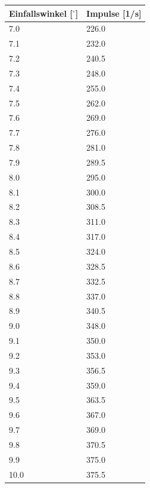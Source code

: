 \begin{minipage}{\linewidth}
    \begin{table}[H]
        \centering
    \begin{tabular}{ll}
        \toprule
        Einfallswinkel [$^\circ$] & Impulse [1/s]  \\
        \midrule
        7.0	    & 226.0 \\
        7.1	    & 232.0 \\
        7.2	    & 240.5 \\
        7.3	    & 248.0 \\
        7.4	    & 255.0 \\
        7.5	    & 262.0 \\
        7.6	    & 269.0 \\
        7.7	    & 276.0 \\
        7.8	    & 281.0 \\
        7.9	    & 289.5 \\
        8.0	    & 295.0 \\
        8.1	    & 300.0 \\
        8.2	    & 308.5 \\
        8.3	    & 311.0 \\
        8.4	    & 317.0 \\
        8.5	    & 324.0 \\
        8.6	    & 328.5 \\
        8.7	    & 332.5 \\
        8.8	    & 337.0 \\
        8.9	    & 340.5 \\
        9.0	    & 348.0 \\
        9.1	    & 350.0 \\
        9.2	    & 353.0 \\
        9.3	    & 356.5 \\
        9.4	    & 359.0 \\
        9.5	    & 363.5 \\
        9.6	    & 367.0 \\
        9.7	    & 369.0 \\
        9.8	    & 370.5 \\
        9.9	    & 375.0 \\
        10.0    & 375.5 \\
        \bottomrule   
    \end{tabular}
    
    \label{tab:3}
\end{table}
\end{minipage}

